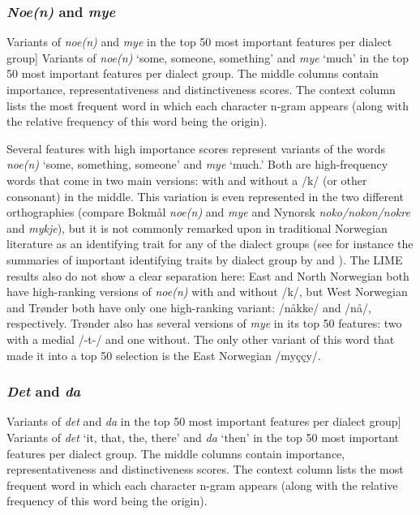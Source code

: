 \subsubsection{\textit{Noe(n)} and \textit{mye}}

\begin{table}[htbp]

    \caption
    [Variants of \textit{noe(n)} and \textit{mye} in the top 50 most important features per dialect group]
    {Variants of \textit{noe(n)} `some, someone, something' and \textit{mye} `much' in the top 50 most important features per dialect group.
    The middle columns contain importance, representativeness and distinctiveness scores.
    The context column lists the most frequent word in which each character n-gram appears (along with the relative frequency of this word being the origin).}
    \label{tab:noe-mye}
\end{table}

Several features with high importance scores represent variants of the words \textit{noe(n)} `some, something, someone' and \textit{mye} `much.'
Both are high-frequency words that come in two main versions: with and without a /k/ (or other consonant) in the middle.
This variation is even represented in the two different orthographies (compare Bokm\aa{}l \textit{noe(n)} and \textit{mye} and Nynorsk \textit{noko/nokon/nokre} and \textit{mykje}), but it is not commonly remarked upon in traditional Norwegian literature as an identifying trait for any of the dialect groups (see for instance the summaries of important identifying traits by dialect group by \citet[pp.~125, 155, 163--164, 187--188]{hanssen2010dialekter} and \citet[pp.~45--54, 76--80, 89--94, 106--111]{maehlum2012dialektlandskapet}).
The LIME results also do not show a clear separation here: East and North Norwegian both have high-ranking versions of \textit{noe(n)} with and without /k/, but West Norwegian and Tr\o{}nder both have only one high-ranking variant: /n\aa{}kke/ and /n\aa/, respectively.
Tr\o{}nder also has several versions of \textit{mye} in its top 50 features: two with a medial /-t-/ and one without.
The only other variant of this word that made it into a top 50 selection is the East Norwegian /my\c{c}\c{c}y/.


\subsubsection{\textit{Det} and \textit{da}}

\begin{table}[htbp]

    \caption
    [Variants of \textit{det} and \textit{da} in the top 50 most important features per dialect group]
    {Variants of \textit{det} `it, that, the, there' and \textit{da} `then' in the top 50 most important features per dialect group.
    The middle columns contain importance, representativeness and distinctiveness scores.
    The context column lists the most frequent word in which each character n-gram appears (along with the relative frequency of this word being the origin).}
    \label{tab:det-da}
\end{table}

